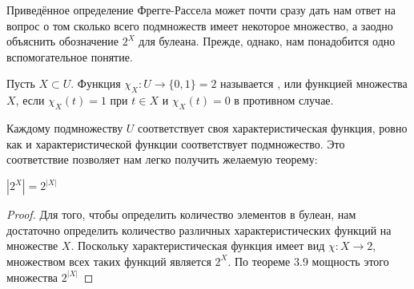 Приведённое определение Фрегге-Рассела может почти сразу дать нам ответ на вопрос о том сколько всего подмножеств имеет некоторое множество, а заодно объяснить обозначение $2^X$ для булеана. Прежде, однако, нам понадобится одно вспомогательное понятие.

\begin{definition}
Пусть $X\subset U$. Функция $\chi_X: U\to \{0,1\} = 2$ называется , или  функцией множества $X$, если $\chi_X(t) = 1$ при $t\in X$ и $\chi_X(t) = 0$ в противном случае.
\end{definition}

Каждому подмножеству $U$ соответствует своя характеристическая функция, ровно как и характеристической функции соответствует подмножество. Это соответствие позволяет нам легко получить желаемую теорему:

\begin{thm}
$|2^X| = 2^{|X|}$
\end{thm}
\begin{proof}
Для того, чтобы определить количество элементов в булеан, нам достаточно определить количество различных характеристических функций на множестве $X$. Поскольку характеристическая функция имеет вид $\chi:X\to 2$, множеством всех таких функций является $2^X$. По теореме 3.9 мощность этого множества $2^{|X|}$
\end{proof}
